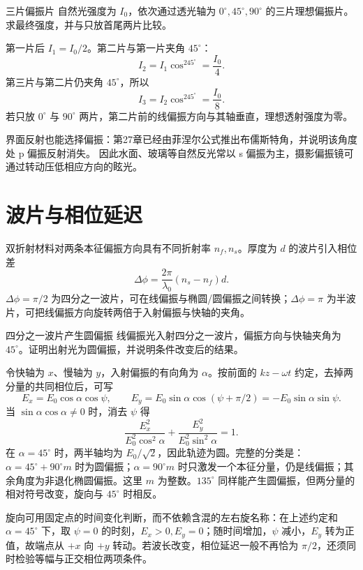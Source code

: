 \begin{origexamplebox}{三片偏振片}
自然光强度为 $I_0$，依次通过透光轴为 $0^\circ,45^\circ,90^\circ$ 的三片理想偏振片。求最终强度，并与只放首尾两片比较。
\end{origexamplebox}
\begin{xesolution}
第一片后 $I_1=I_0/2$。第二片与第一片夹角 $45^\circ$：
\[
 I_2=I_1\cos^245^\circ=\frac{I_0}{4}.
\]
第三片与第二片仍夹角 $45^\circ$，所以
\[
 \boxed{I_3=I_2\cos^245^\circ=\frac{I_0}{8}}.
\]
若只放 $0^\circ$ 与 $90^\circ$ 两片，第二片前的线偏振方向与其轴垂直，理想透射强度为零。
\end{xesolution}

界面反射也能选择偏振：第27章已经由菲涅尔公式推出布儒斯特角，并说明该角度处 p 偏振反射消失。
因此水面、玻璃等自然反光常以 s 偏振为主，摄影偏振镜可通过转动压低相应方向的眩光。

\section{波片与相位延迟}

双折射材料对两条本征偏振方向具有不同折射率 $n_f,n_s$。厚度为 $d$ 的波片引入相位差
\begin{equation}
 \Delta\phi=\frac{2\pi}{\lambda_0}(n_s-n_f)d.
\end{equation}
$\Delta\phi=\pi/2$ 为四分之一波片，可在线偏振与椭圆/圆偏振之间转换；$\Delta\phi=\pi$ 为半波片，可把线偏振方向旋转两倍于入射偏振与快轴的夹角。

\begin{origexamplebox}{四分之一波片产生圆偏振}
线偏振光入射四分之一波片，偏振方向与快轴夹角为 $45^\circ$。证明出射光为圆偏振，并说明条件改变后的结果。
\end{origexamplebox}
\begin{xesolution}
令快轴为 $x$、慢轴为 $y$，入射偏振的有向角为 $\alpha$。按前面的 $kz-\omega t$ 约定，去掉两分量的共同相位后，可写
\[
 E_x=E_0\cos\alpha\cos\psi,\qquad
 E_y=E_0\sin\alpha\cos(\psi+\pi/2)=-E_0\sin\alpha\sin\psi.
\]
当 $\sin\alpha\cos\alpha\ne0$ 时，消去 $\psi$ 得
\[
 \frac{E_x^2}{E_0^2\cos^2\alpha}
 +\frac{E_y^2}{E_0^2\sin^2\alpha}=1.
\]
在 $\alpha=45^\circ$ 时，两半轴均为 $E_0/\sqrt2$，因此轨迹为圆。完整的分类是：
$\alpha=45^\circ+90^\circ m$ 时为圆偏振；$\alpha=90^\circ m$ 时只激发一个本征分量，仍是线偏振；其余角度为非退化椭圆偏振。这里 $m$ 为整数。$135^\circ$ 同样能产生圆偏振，但两分量的相对符号改变，旋向与 $45^\circ$ 时相反。

旋向可用固定点的时间变化判断，而不依赖含混的左右旋名称：在上述约定和 $\alpha=45^\circ$ 下，取 $\psi=0$ 的时刻，$E_x>0,E_y=0$；随时间增加，$\psi$ 减小，$E_y$ 转为正值，故端点从 $+x$ 向 $+y$ 转动。若波长改变，相位延迟一般不再恰为 $\pi/2$，还须同时检验等幅与正交相位两项条件。
\end{xesolution}

